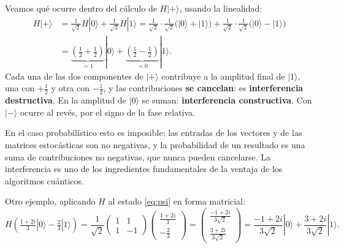 \documentclass[11pt, a4paper, twoside, openright]{report}
\begin{document}
\begin{tcolorbox}[colback=blue!5!white,colframe=blue!75!black,title=\textbf{Nota Aclaratoria: Qué es la interferencia}]
Veamos qué ocurre dentro del cálculo de $H|+\rangle$, usando la linealidad:
\begin{align*}
H|+\rangle &= \tfrac{1}{\sqrt 2}H|0\rangle + \tfrac{1}{\sqrt 2}H|1\rangle
= \tfrac{1}{\sqrt 2}\cdot\tfrac{1}{\sqrt 2}\big(|0\rangle + |1\rangle\big) + \tfrac{1}{\sqrt 2}\cdot\tfrac{1}{\sqrt 2}\big(|0\rangle - |1\rangle\big) \\
&= \underbrace{\left(\tfrac12 + \tfrac12\right)}_{=1}|0\rangle + \underbrace{\left(\tfrac12 - \tfrac12\right)}_{=0}|1\rangle.
\end{align*}
Cada una de las dos componentes de $|+\rangle$ contribuye a la amplitud final de $|1\rangle$, una con $+\frac12$ y otra con $-\frac12$, y las contribuciones \textbf{se cancelan}: es \textbf{interferencia destructiva}. En la amplitud de $|0\rangle$ se suman: \textbf{interferencia constructiva}. Con $|-\rangle$ ocurre al revés, por el signo de la fase relativa.

En el caso probabilístico esto es imposible: las entradas de los vectores y de las matrices estocásticas son no negativas, y la probabilidad de un resultado es una suma de contribuciones no negativas, que nunca pueden cancelarse. La interferencia es uno de los ingredientes fundamentales de la ventaja de los algoritmos cuánticos.
\end{tcolorbox}

\noindent Otro ejemplo, aplicando $H$ al estado \eqref{eq:psi} en forma matricial:
\[
H\left(\tfrac{1+2i}{3}|0\rangle - \tfrac23|1\rangle\right)
= \frac{1}{\sqrt 2}\begin{pmatrix} 1 & 1 \\ 1 & -1 \end{pmatrix}\begin{pmatrix} \frac{1+2i}{3} \\ -\frac23 \end{pmatrix}
= \begin{pmatrix} \frac{-1+2i}{3\sqrt 2} \\[1mm] \frac{3+2i}{3\sqrt 2} \end{pmatrix}
= \frac{-1+2i}{3\sqrt 2}|0\rangle + \frac{3+2i}{3\sqrt 2}|1\rangle.
\]
\end{document}
